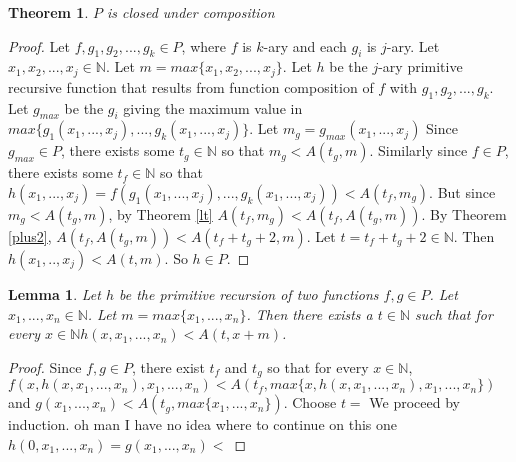 \documentclass[12pt, letterpaper]{article}
\newtheorem{theorem}{Theorem}
\newtheorem{lemma}{Lemma}
\theoremstyle{case}
\begin{document}
    \begin{theorem}
      $P$ is closed under composition
    \end{theorem}
    \begin{proof}
      Let $f, g_1, g_2, ..., g_k \in P$, where $f$ is $k$-ary and each $g_i$ is $j$-ary.
      Let $x_1, x_2, ..., x_j \in \mathbb{N}$.
      Let $m = max\{x_1, x_2, ..., x_j\}$.
      Let $h$ be the $j$-ary primitive recursive function that results from function composition of $f$ with $g_1, g_2, ..., g_k$.
      Let $g_{max}$ be the $g_i$ giving the maximum value in $max\{g_1(x_1, ..., x_j), ..., g_k(x_1, ..., x_j)\}$.
      Let $m_g = g_{max}(x_1, ..., x_j)$
      Since $g_{max} \in P$, there exists some $t_g \in \mathbb{N}$ so that $m_g < A(t_g, m)$.
      Similarly since $f \in P$, there exists some $t_f \in \mathbb{N}$ so that $h(x_1, ..., x_j) = f(g_1(x_1, ..., x_j), ..., g_k(x_1, ..., x_j)) < A(t_f, m_g)$.
      But since $m_g < A(t_g, m)$, by Theorem \ref{lt} $A(t_f, m_g) < A(t_f, A(t_g, m))$.
      By Theorem \ref{plus2}, $A(t_f, A(t_g, m)) < A(t_f + t_g + 2, m)$.
      Let $t = t_f + t_g + 2 \in \mathbb{N}$.
      Then $h(x_1, .., x_j) < A(t, m)$.
      So $h \in P$.
    \end{proof}

    \begin{lemma}
      \label{recursionlemma}
      Let $h$ be the primitive recursion of two functions $f, g \in P$.
      Let $x_1, ..., x_n \in \mathbb{N}$.
      Let $m = max\{x_1, ..., x_n\}$.
      Then there exists a $t \in \mathbb{N}$ such that for every $x \in \mathbb{N}
      h(x, x_1, ..., x_n) < A(t, x + m)$.
    \end{lemma}
    \begin{proof}
      Since $f, g \in P$, there exist $t_f$ and $t_g$ so that for every $x \in \mathbb{N}$, 
      $f(x, h(x, x_1, ..., x_n), x_1, ..., x_n) < A(t_f, max\{x, h(x, x_1, ..., x_n), x_1, ..., x_n\})$ and
      $g(x_1, ..., x_n) < A(t_g, max\{x_1, ..., x_n\})$.
      Choose $t = $
      We proceed by induction.
      oh man I have no idea where to continue on this one
      $h(0, x_1, ..., x_n) = g(x_1, ..., x_n) < $
    \end{proof}
\end{document}
